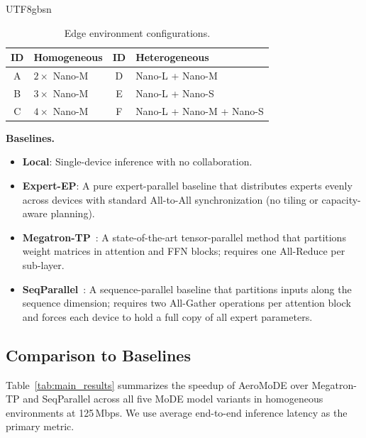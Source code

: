 \documentclass[conference]{IEEEtran}
\begin{document}
\begin{CJK*}{UTF8}{gbsn}
\begin{table}[t]
  \caption{Edge environment configurations.}
  \label{tab:envs}
  \centering
  \renewcommand{\arraystretch}{1.2}
  \begin{tabular}{cl|cl}
    \toprule
    \textbf{ID} & \textbf{Homogeneous} &
    \textbf{ID} & \textbf{Heterogeneous} \\
    \midrule
    A & $2 \times$ Nano-M & D & Nano-L + Nano-M \\
    B & $3 \times$ Nano-M & E & Nano-L + Nano-S \\
    C & $4 \times$ Nano-M & F & Nano-L + Nano-M + Nano-S \\
    \bottomrule
  \end{tabular}
\end{table}

\textbf{Baselines.}
\begin{itemize}
  \item \textbf{Local}: Single-device inference with no collaboration.
  \item \textbf{Expert-EP}: A pure expert-parallel baseline that
    distributes experts evenly across devices with standard
    All-to-All synchronization (no tiling or capacity-aware planning).
  \item \textbf{Megatron-TP}~\cite{shoeybi2019megatron}: A
    state-of-the-art tensor-parallel method that partitions weight
    matrices in attention and FFN blocks; requires one All-Reduce per
    sub-layer.
  \item \textbf{SeqParallel}~\cite{li2021sequence}: A sequence-parallel
    baseline that partitions inputs along the sequence dimension;
    requires two All-Gather operations per attention block and forces
    each device to hold a full copy of all expert parameters.
\end{itemize}

\subsection{Comparison to Baselines}
\label{sec:comparison}

Table~\ref{tab:main_results} summarizes the speedup of AeroMoDE
over Megatron-TP and SeqParallel across all five MoDE model variants
in homogeneous environments at 125\,Mbps.  We use average
end-to-end inference latency as the primary metric.


\end{CJK*}
\end{document}
